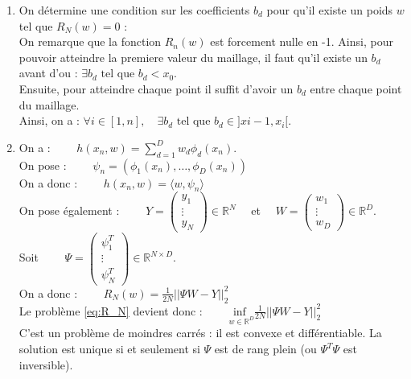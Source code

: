 \documentclass[12pt,a4paper]{article}
\begin{document}
\begin{enumerate}
    \item On détermine une condition sur les coefficients $b_d$ pour qu’il existe un poids $w$ tel que $R_N(w) = 0$ :\\
    On remarque que la fonction $R_n(w)$ est forcement nulle en -1.
    Ainsi, pour pouvoir atteindre la premiere valeur du maillage, il faut qu'il existe un $b_d$ avant d'ou :
    $\exists b_d \text{ tel que }  b_d < x_0 $.\\
    Ensuite, pour atteindre chaque point il suffit d'avoir un $b_d$ entre chaque point du maillage.\\
    Ainsi, on a : $\forall i \in [1,n], \quad \exists b_d \text{ tel que }  b_d \in ]x{i-1},x_i[ $.
    



    \item On a : $\qquad h(x_n, w) = \sum_{d=1}^D w_d \phi_d(x_n)$.\\
    
    On pose : $\qquad \psi_n = (\phi_1(x_n), \dots, \phi_D(x_n))$\\

    On a donc : $\qquad h(x_n, w) = \langle w, \psi_n \rangle$\\

    On pose également : $\qquad Y = \begin{pmatrix}
        y_1 \\
        \vdots \\
        y_N
        \end{pmatrix} \in \mathbb{R}^N \quad$ et $\quad W = \begin{pmatrix}
        w_1 \\
        \vdots \\
        w_D
        \end{pmatrix} \in \mathbb{R}^D$.\\

    Soit $\qquad \Psi = \begin{pmatrix}
        \psi_1^T \\
        \vdots \\
        \psi_N^T
        \end{pmatrix} \in \mathbb{R}^{N \times D}$.\\

    On a donc : $\qquad R_N(w) = \frac{1}{2N} ||\Psi W - Y||_2^2$\\

    Le problème \eqref{eq:R_N} devient donc : $\qquad \underset{w \in \mathbb{R}^D}{\text{inf }} \frac{1}{2N} ||\Psi W - Y||_2^2$\\

    C'est un problème de moindres carrés : il est convexe et différentiable.
    La solution est unique si et seulement si $\Psi$ est de rang plein (ou $\Psi^T \Psi$ est inversible).\\
\end{enumerate}
\end{document}
